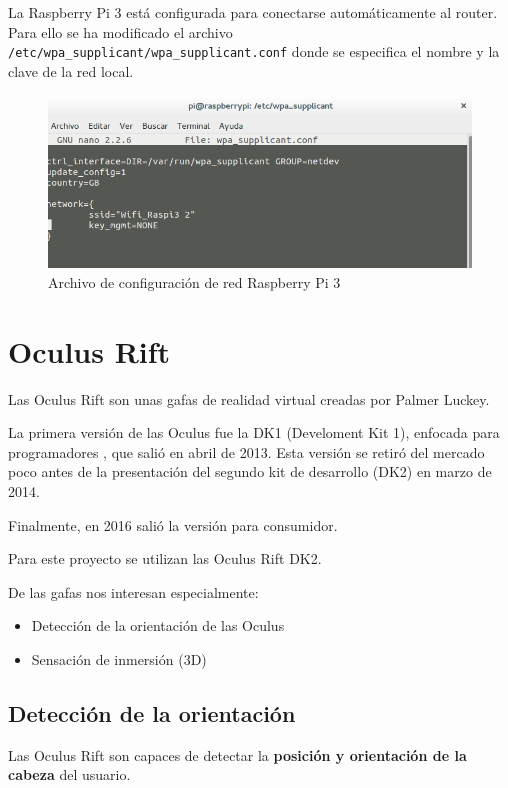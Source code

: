 \documentclass[twoside, 12pt]{epstfg}
\begin{document}
La Raspberry Pi 3 está configurada para conectarse automáticamente al router. Para ello se ha modificado el archivo \texttt{/etc/wpa\_supplicant/wpa\_supplicant.conf} donde se especifica el nombre y la clave de la red local.

\begin{figure}[h]
	\centerline{
		\mbox{\includegraphics[width=.95\textwidth]{images/confRaspiWifi.png}}
	}
	\caption{Archivo de configuración de red Raspberry Pi 3}
\end{figure}
 

\section{Oculus Rift}

Las Oculus Rift son unas gafas de realidad virtual creadas por Palmer Luckey.

La primera versión de las Oculus fue la DK1 (Develoment Kit 1), enfocada para programadores , que salió en abril de 2013. Esta versión se retiró del mercado poco antes de la presentación del segundo kit de desarrollo (DK2) en marzo de 2014.

Finalmente, en 2016 salió la versión para consumidor.

Para este proyecto se utilizan las Oculus Rift DK2.


De las gafas nos interesan especialmente:
\begin{itemize}
	\item Detección de la orientación de las Oculus
	\item Sensación de inmersión (3D)
\end{itemize}

\subsection{Detección de la orientación}


Las Oculus Rift son capaces de detectar la \textbf{posición y orientación de la cabeza} del usuario.
\end{document}
